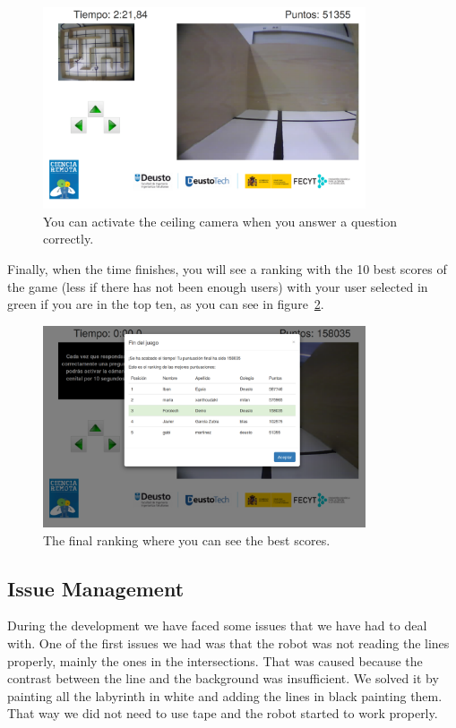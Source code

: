 \begin{figure}[!htbp]
	\centering
	\includegraphics[width=0.85\textwidth]{fig/manuals/trivial/romie-ceiling}
	\caption{You can activate the ceiling camera when you answer a question correctly.}
	\label{fig:man:romie_ceiling}
\end{figure}

Finally, when the time finishes, you will see a ranking with the 10 best scores of the game (less if
there has not been enough users) with your user selected in green if you are in the top ten, as you
can see in figure~\ref{fig:man:romie_ranking}.

\begin{figure}[!htbp]
	\centering
	\includegraphics[width=0.85\textwidth]{fig/manuals/trivial/romie-ranking}
	\caption{The final ranking where you can see the best scores.}
	\label{fig:man:romie_ranking}
\end{figure}

\subsection{Issue Management}

During the development we have faced some issues that we have had to deal with. One of the first
issues we had was that the robot was not reading the lines properly, mainly the ones in the
intersections. That was caused because the contrast between the line and the background was
insufficient. We solved it by painting all the labyrinth in white and adding the lines in black
painting them. That way we did not need to use tape and the robot started to work properly.


